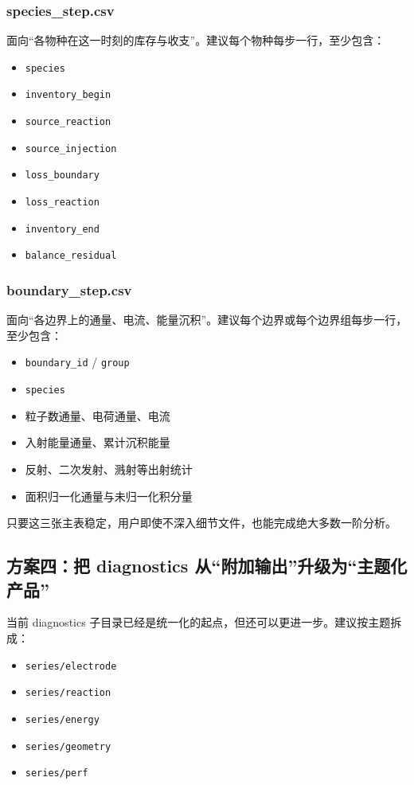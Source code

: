 \documentclass[11pt,a4paper]{ctexart}
\newcommand{\code}[1]{\texttt{#1}}
\newcommand{\dir}[1]{\texttt{#1}}
\begin{document}
\subsubsection{species\_step.csv}

面向“各物种在这一时刻的库存与收支”。建议每个物种每步一行，至少包含：

\begin{itemize}
  \item \code{species}
  \item \code{inventory\_begin}
  \item \code{source\_reaction}
  \item \code{source\_injection}
  \item \code{loss\_boundary}
  \item \code{loss\_reaction}
  \item \code{inventory\_end}
  \item \code{balance\_residual}
\end{itemize}

\subsubsection{boundary\_step.csv}

面向“各边界上的通量、电流、能量沉积”。建议每个边界或每个边界组每步一行，至少包含：

\begin{itemize}
  \item \code{boundary\_id} / \code{group}
  \item \code{species}
  \item 粒子数通量、电荷通量、电流
  \item 入射能量通量、累计沉积能量
  \item 反射、二次发射、溅射等出射统计
  \item 面积归一化通量与未归一化积分量
\end{itemize}

只要这三张主表稳定，用户即使不深入细节文件，也能完成绝大多数一阶分析。

\subsection{方案四：把 diagnostics 从“附加输出”升级为“主题化产品”}

当前 diagnostics 子目录已经是统一化的起点，但还可以更进一步。建议按主题拆成：

\begin{itemize}
  \item \dir{series/electrode}
  \item \dir{series/reaction}
  \item \dir{series/energy}
  \item \dir{series/geometry}
  \item \dir{series/perf}
\end{itemize}
\end{document}
